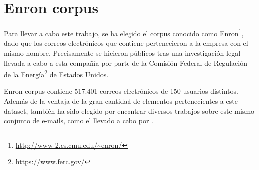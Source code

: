 \section{Enron corpus}\label{s:enron}
Para llevar a cabo este trabajo, se ha elegido el corpus conocido como Enron\footnote{\url{http://www-2.cs.cmu.edu/~enron/}}, dado que los correos electrónicos que contiene pertenecieron a la empresa con el mismo nombre. Precisamente se hicieron públicos tras una investigación legal llevada a cabo a esta compañía por parte de la Comisión Federal de Regulación de la Energía\footnote{\url{https://www.ferc.gov/}} de Estados Unidos.

Enron corpus contiene 517.401 correos electrónicos de 150 usuarios distintos. Además de la ventaja de la gran cantidad de elementos pertenecientes a este dataset, también ha sido elegido por encontrar diversos trabajos sobre este mismo conjunto de e-mails, como el llevado a cabo por \cite{klimt2004introducing}.